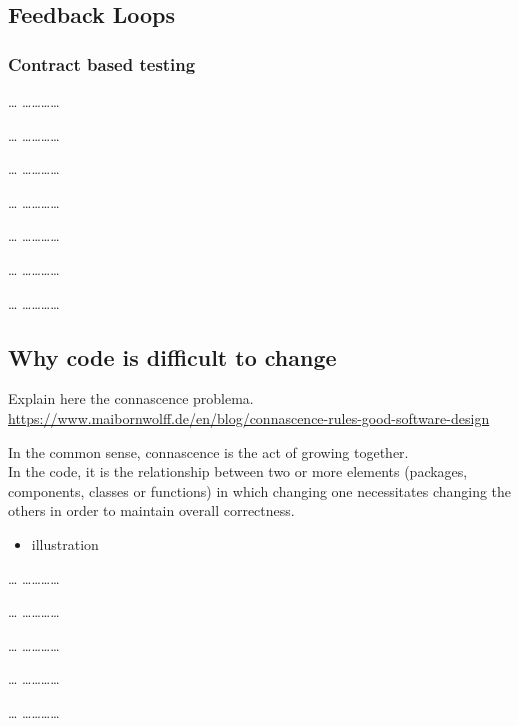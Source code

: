 \subsection{Feedback Loops}\label{feedback-loops}

\subsubsection{Contract based testing}\label{contract-based-testing}

\ldots{} \ldots{}\ldots{}\ldots{}\ldots{}

\ldots{} \ldots{}\ldots{}\ldots{}\ldots{}

\ldots{} \ldots{}\ldots{}\ldots{}\ldots{}

\ldots{} \ldots{}\ldots{}\ldots{}\ldots{}

\ldots{} \ldots{}\ldots{}\ldots{}\ldots{}

\ldots{} \ldots{}\ldots{}\ldots{}\ldots{}

\ldots{} \ldots{}\ldots{}\ldots{}\ldots{}

\subsection{Why code is difficult to
change}\label{why-code-is-difficult-to-change}

Explain here the connascence
problema.\\\url{https://www.maibornwolff.de/en/blog/connascence-rules-good-software-design}

In the common sense, connascence is the act of growing together.\\In the
code, it is the relationship between two or more elements (packages,
components, classes or functions) in which changing one necessitates
changing the others in order to maintain overall correctness.

\begin{itemize}
\itemsep1pt\parskip0pt
\item
  illustration
\end{itemize}

\ldots{} \ldots{}\ldots{}\ldots{}\ldots{}

\ldots{} \ldots{}\ldots{}\ldots{}\ldots{}

\ldots{} \ldots{}\ldots{}\ldots{}\ldots{}

\ldots{} \ldots{}\ldots{}\ldots{}\ldots{}

\ldots{} \ldots{}\ldots{}\ldots{}\ldots{}

